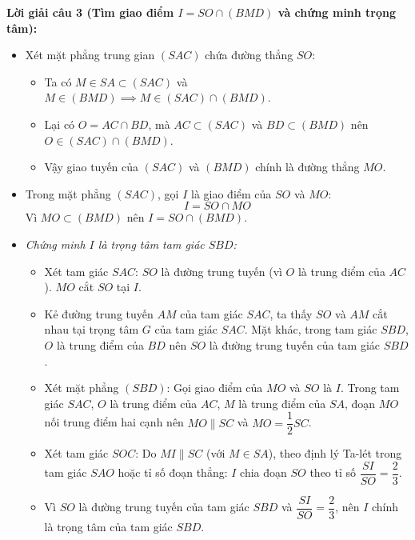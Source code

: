\documentclass[12pt, a4paper]{article}
\begin{document}
\noindent \textbf{Lời giải câu 3 (Tìm giao điểm $I = SO \cap (BMD)$ và chứng minh trọng tâm):}
\begin{itemize}
    \item Xét mặt phẳng trung gian $(SAC)$ chứa đường thẳng $SO$:
    \begin{itemize}
        \item Ta có $M \in SA \subset (SAC)$ và $M \in (BMD) \implies M \in (SAC) \cap (BMD)$.
        \item Lại có $O = AC \cap BD$, mà $AC \subset (SAC)$ và $BD \subset (BMD)$ nên $O \in (SAC) \cap (BMD)$.
        \item Vậy giao tuyến của $(SAC)$ và $(BMD)$ chính là đường thẳng $MO$.
    \end{itemize}
    \item Trong mặt phẳng $(SAC)$, gọi $I$ là giao điểm của $SO$ và $MO$:
    $$I = SO \cap MO$$
    Vì $MO \subset (BMD)$ nên $I = SO \cap (BMD)$.
    \item \textit{Chứng minh $I$ là trọng tâm tam giác $SBD$:}
    \begin{itemize}
        \item Xét tam giác $SAC$: $SO$ là đường trung tuyến (vì $O$ là trung điểm của $AC$). $MO$ cắt $SO$ tại $I$.
        \item Kẻ đường trung tuyến $AM$ của tam giác $SAC$, ta thấy $SO$ và $AM$ cắt nhau tại trọng tâm $G$ của tam giác $SAC$. Mặt khác, trong tam giác $SBD$, $O$ là trung điểm của $BD$ nên $SO$ là đường trung tuyến của tam giác $SBD$.
        \item Xét mặt phẳng $(SBD)$: Gọi giao điểm của $MO$ và $SO$ là $I$. Trong tam giác $SAC$, $O$ là trung điểm của $AC$, $M$ là trung điểm của $SA$, đoạn $MO$ nối trung điểm hai cạnh nên $MO \parallel SC$ và $MO = \dfrac{1}{2}SC$.
        \item Xét tam giác $SOC$: Do $MI \parallel SC$ (với $M \in SA$), theo định lý Ta-lét trong tam giác $SAO$ hoặc tỉ số đoạn thẳng: $I$ chia đoạn $SO$ theo tỉ số $\dfrac{SI}{SO} = \dfrac{2}{3}$.
        \item Vì $SO$ là đường trung tuyến của tam giác $SBD$ và $\dfrac{SI}{SO} = \dfrac{2}{3}$, nên $I$ chính là trọng tâm của tam giác $SBD$.
    \end{itemize}
\end{itemize}
\end{document}
